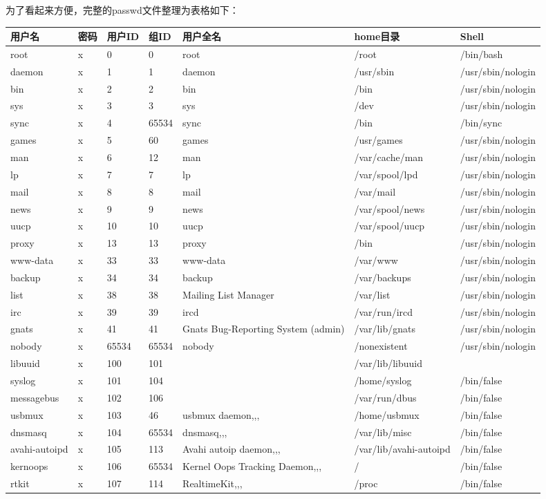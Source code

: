 为了看起来方便，完整的passwd文件整理为表格如下：\\
{\tiny
\begin{tabular}{l|l|l|l|l|l|l}
用户名&密码&用户ID&组ID&用户全名&home目录&Shell\\
\hline
root&x&0&0&root&/root&/bin/bash\\
daemon&x&1&1&daemon&/usr/sbin&/usr/sbin/nologin\\
bin&x&2&2&bin&/bin&/usr/sbin/nologin\\
sys&x&3&3&sys&/dev&/usr/sbin/nologin\\
sync&x&4&65534&sync&/bin&/bin/sync\\
games&x&5&60&games&/usr/games&/usr/sbin/nologin\\
man&x&6&12&man&/var/cache/man&/usr/sbin/nologin\\
lp&x&7&7&lp&/var/spool/lpd&/usr/sbin/nologin\\
mail&x&8&8&mail&/var/mail&/usr/sbin/nologin\\
news&x&9&9&news&/var/spool/news&/usr/sbin/nologin\\
uucp&x&10&10&uucp&/var/spool/uucp&/usr/sbin/nologin\\
proxy&x&13&13&proxy&/bin&/usr/sbin/nologin\\
www-data&x&33&33&www-data&/var/www&/usr/sbin/nologin\\
backup&x&34&34&backup&/var/backups&/usr/sbin/nologin\\
list&x&38&38&Mailing List Manager&/var/list&/usr/sbin/nologin\\
irc&x&39&39&ircd&/var/run/ircd&/usr/sbin/nologin\\
gnats&x&41&41&Gnats Bug-Reporting System (admin)&/var/lib/gnats&/usr/sbin/nologin\\
nobody&x&65534&65534&nobody&/nonexistent&/usr/sbin/nologin\\
libuuid&x&100&101&&/var/lib/libuuid&\\
syslog&x&101&104&&/home/syslog&/bin/false\\
messagebus&x&102&106&&/var/run/dbus&/bin/false\\
usbmux&x&103&46&usbmux daemon,,,&/home/usbmux&/bin/false\\
dnsmasq&x&104&65534&dnsmasq,,,&/var/lib/misc&/bin/false\\
avahi-autoipd&x&105&113&Avahi autoip daemon,,,&/var/lib/avahi-autoipd&/bin/false\\
kernoops&x&106&65534&Kernel Oops Tracking Daemon,,,&/&/bin/false\\
rtkit&x&107&114&RealtimeKit,,,&/proc&/bin/false\\

\end{tabular}}
